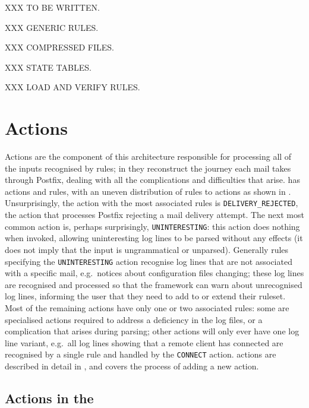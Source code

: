 XXX TO BE WRITTEN\@.

XXX GENERIC RULES\@.

XXX COMPRESSED FILES\@.

XXX STATE TABLES\@.

XXX LOAD AND VERIFY RULES\@.

\section{Actions}

\label{actions in implementation}

Actions are the component of this architecture responsible for processing
all of the inputs recognised by rules; in \parsername{} they reconstruct
the journey each mail takes through Postfix, dealing with all the
complications and difficulties that arise.  \parsername{} has
\numberOFactions{} actions and \numberOFrules{} rules, with an uneven
distribution of rules to actions as shown in .  Unsurprisingly, the action with the most associated
rules is \texttt{DELIVERY\_REJECTED}, the action that processes Postfix
rejecting a mail delivery attempt.  The next most common action is, perhaps
surprisingly, \texttt{UNINTERESTING}: this action does nothing when
invoked, allowing uninteresting log lines to be parsed without any effects
(it does not imply that the input is ungrammatical or unparsed).  Generally
rules specifying the \texttt{UNINTERESTING} action recognise log lines that
are not associated with a specific mail, e.g.\ notices about configuration
files changing; these log lines are recognised and processed so that the
framework can warn about unrecognised log lines, informing the user that
they need to add to or extend their ruleset.  Most of the remaining actions
have only one or two associated rules: some are specialised actions
required to address a deficiency in the log files, or a complication that
arises during parsing; other actions will only ever have one log line
variant, e.g.\ all log lines showing that a remote client has connected are
recognised by a single rule and handled by the \texttt{CONNECT} action.
\parsernames{} actions are described in detail in , and  covers the process of adding a new action.


\subsection{Actions in the \parsernamelong{}}

